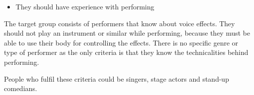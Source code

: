 \begin{itemize}
	\item They should have experience with performing 
\end{itemize}

The target group consists of performers that know about voice effects. They should not play an instrument or similar while performing, because they must be able to use their body for controlling the effects. There is no specific genre or type of performer as the only criteria is that they know the technicalities behind performing.

People who fulfil these criteria could be singers, stage actors and stand-up comedians.
